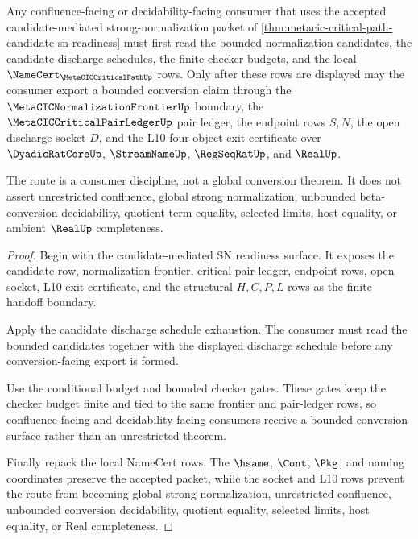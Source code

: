 \begin{theorem}
\label{thm:metacic-critical-path-bounded-conversion-consumer-route}
Any confluence-facing or decidability-facing consumer that uses the accepted candidate-mediated strong-normalization packet of \autoref{thm:metacic-critical-path-candidate-sn-readiness} must first read the bounded normalization candidates, the candidate discharge schedules, the finite checker budgets, and the local $\NameCert_{\MetaCICCriticalPathUp}$ rows. Only after these rows are displayed may the consumer export a bounded conversion claim through the $\MetaCICNormalizationFrontierUp$ boundary, the $\MetaCICCriticalPairLedgerUp$ pair ledger, the endpoint rows $S,N$, the open discharge socket $D$, and the L10 four-object exit certificate over $\DyadicRatCoreUp$, $\StreamNameUp$, $\RegSeqRatUp$, and $\RealUp$.

The route is a consumer discipline, not a global conversion theorem. It does not assert unrestricted confluence, global strong normalization, unbounded beta-conversion decidability, quotient term equality, selected limits, host equality, or ambient $\RealUp$ completeness.
\end{theorem}
\begin{proof}
Begin with the candidate-mediated SN readiness surface. It exposes the candidate row, normalization frontier, critical-pair ledger, endpoint rows, open socket, L10 exit certificate, and the structural $H,C,P,L$ rows as the finite handoff boundary.

Apply the candidate discharge schedule exhaustion. The consumer must read the bounded candidates together with the displayed discharge schedule before any conversion-facing export is formed.

Use the conditional budget and bounded checker gates. These gates keep the checker budget finite and tied to the same frontier and pair-ledger rows, so confluence-facing and decidability-facing consumers receive a bounded conversion surface rather than an unrestricted theorem.

Finally repack the local NameCert rows. The $\hsame$, $\Cont$, $\Pkg$, and naming coordinates preserve the accepted packet, while the socket and L10 rows prevent the route from becoming global strong normalization, unrestricted confluence, unbounded conversion decidability, quotient equality, selected limits, host equality, or Real completeness.
\end{proof}

